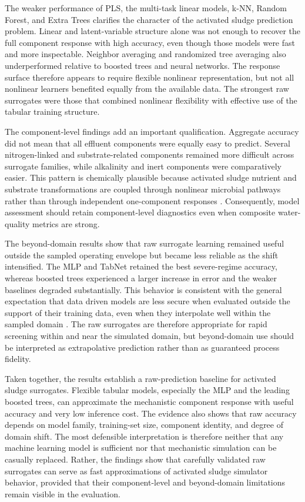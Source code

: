 \documentclass[12pt, twoside]{book}
\begin{document}
The weaker performance of PLS, the multi-task linear models, k-NN, Random Forest, and Extra Trees clarifies
the character of the activated sludge prediction problem. Linear and latent-variable structure alone was not
enough to recover the full component response with high accuracy, even though those models were fast and more
inspectable. Neighbor averaging and randomized tree averaging also underperformed relative to boosted trees
and neural networks. The response surface therefore appears to require flexible nonlinear representation, but
not all nonlinear learners benefited equally from the available data. The strongest raw surrogates were those
that combined nonlinear flexibility with effective use of the tabular training structure.

The component-level findings add an important qualification. Aggregate accuracy did not mean that all
effluent components were equally easy to predict. Several nitrogen-linked and substrate-related components
remained more difficult across surrogate families, while alkalinity and inert components were comparatively
easier. This pattern is chemically plausible because activated sludge nutrient and substrate transformations
are coupled through nonlinear microbial pathways rather than through independent one-component responses
\citep{Henze2006,Guerrero2011}. Consequently, model assessment should retain component-level diagnostics even
when composite water-quality metrics are strong.

The beyond-domain results show that raw surrogate learning remained useful outside the sampled operating
envelope but became less reliable as the shift intensified. The MLP and TabNet retained the best severe-regime
accuracy, whereas boosted trees experienced a larger increase in error and the weaker baselines degraded
substantially. This behavior is consistent with the general expectation that data driven models are less
secure when evaluated outside the support of their training data, even when they interpolate well within the
sampled domain \citep{Karniadakis2021,Shen2023,Valente2025}. The raw surrogates are therefore appropriate for
rapid screening within and near the simulated domain, but beyond-domain use should be interpreted as
extrapolative prediction rather than as guaranteed process fidelity.

Taken together, the results establish a raw-prediction baseline for activated sludge surrogates. Flexible
tabular models, especially the MLP and the leading boosted trees, can approximate the mechanistic component
response with useful accuracy and very low inference cost. The evidence also shows that raw accuracy depends
on model family, training-set size, component identity, and degree of domain shift. The most defensible
interpretation is therefore neither that any machine learning model is sufficient nor that mechanistic
simulation can be casually replaced. Rather, the findings show that carefully validated raw surrogates can
serve as fast approximations of activated sludge simulator behavior, provided that their component-level and
beyond-domain limitations remain visible in the evaluation.
\end{document}
